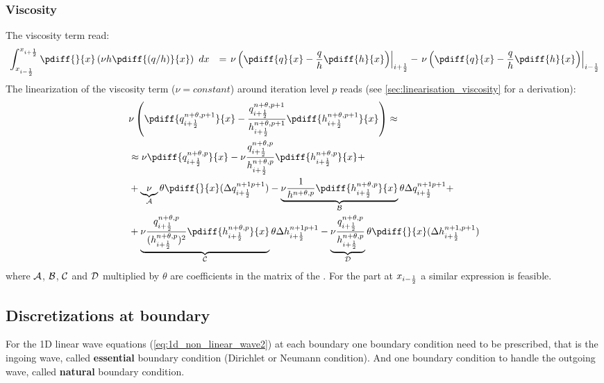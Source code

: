 \subsubsection{Viscosity}
The viscosity term read:
\begin{align}
    &  \int^{x_{i+\half}}_{x_{i-\half}} \pdiff{}{x} \left( \nu h \pdiff{(q/h)}{x} \right)\ dx & =
    \left. \nu \left( \pdiff{q}{x} - \frac{q}{h} \pdiff{h}{x} \right) \right|_{i+\half} - \left. \nu \left( \pdiff{q}{x} - \frac{q}{h} \pdiff{h}{x} \right) \right|_{i-\half}
\end{align}
The linearization of the viscosity term ($\nu = {\mathit constant}$) around iteration level $p$ reads (see \autoref{sec:linearisation_viscosity} for a derivation):
\begin{align}
    &\nu \left(\pdiff{q^{n+\theta, p+1}_{i+\half}}{x} - \frac{q^{n+\theta, p+1}_{i+\half}}{h^{n+\theta, p+1}_{i+\half}} \pdiff{h^{n+\theta, p+1}_{i+\half}}{x} \right) \approx
    \\
    & \approx \nu  \pdiff{q^{n+\theta, p}_{i+\half}}{x}   -  \nu \frac{q^{n+\theta, p}_{i+\half}}{h^{n+\theta, p}_{i+\half}} \pdiff{h^{n+\theta, p}_{i+\half}}{x}  +
    \nonumber \\
    & + \underbrace{\nu}_{\cal{A}}\theta \pdiff{}{x}( \Delta q^{n+1 p+1}_{i+\half})
    -  \underbrace{\nu \frac{1}{h^{n+\theta, p}}\pdiff{h^{n+\theta, p}_{i+\half}}{x}}_{\cal{B}} \theta\Delta q^{n+1 p+1}_{i+\half}  +
    \nonumber \\
    & +  \underbrace{\nu \frac{q^{n+\theta, p}_{i+\half}}{(h^{n+\theta, p}_{i+\half})^2} \pdiff{h^{n+\theta, p}_{i+\half}}{x}}_{\cal{C}} \theta\Delta h^{n+1 p+1}_{i+\half}
    - \underbrace{\nu \frac{q^{n+\theta, p}_{i+\half}}{h^{n+\theta, p}_{i+\half}}}_{\cal{D}} \theta \pdiff{}{x}( \Delta h^{n+1, p+1}_{i+\half})
\end{align}
where $\cal{A}$, $\cal{B}$, $\cal{C}$ and $\cal{D}$ multiplied by $\theta$ are coefficients in the matrix of the \deltaformulation.
For the part at $x_{i-\frac{1}{2}}$ a similar expression is feasible.

\subsection{Discretizations at boundary}\label{sec:discretized_boundary_1d}
For the 1D linear wave equations (\autoref{eq:1d_non_linear_wave2}) at each boundary one boundary condition need to be prescribed, that is the ingoing wave, called \textbf{essential} boundary condition (Dirichlet or Neumann condition).
And one boundary condition to handle the outgoing wave, called \textbf{natural} boundary condition.

